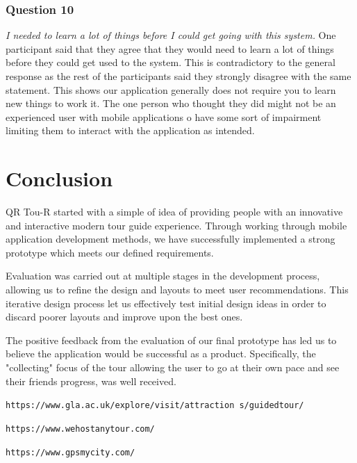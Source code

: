 \documentclass[a4,10pt,twocolumn]{article}
\begin{document}
\subsubsection{Question 10}
\noindent\emph{I needed to learn a lot of things before I could get going with this system.}
\newline
\newline
One participant said that they agree that they would need to learn a lot of things before they could get used to the system. This is contradictory to the general response as the rest of the participants said they strongly disagree with the same statement. This shows our application generally does not require you to learn new things to work it. The one person who thought they did might not be an experienced user with mobile applications o have some sort of impairment limiting them to interact with the application as intended.

\section{Conclusion}
QR Tou-R started with a simple of idea of providing people with an innovative and interactive modern tour guide experience. Through working through mobile application development methods, we have successfully implemented a strong prototype which meets our defined requirements. 

Evaluation was carried out at multiple stages in the development process, allowing us to refine the design and layouts to meet user recommendations. This iterative design process let us effectively test initial design ideas in order to discard poorer layouts and improve upon the best ones. 

The positive feedback from the evaluation of our final prototype has led us to believe the application would be successful as a product. Specifically, the "collecting" focus of the tour allowing the user to go at their own pace and see their friends progress, was well received.

\begin{thebibliography}{9}
\texttt{https://www.gla.ac.uk/explore/visit/attraction
s/guidedtour/}

\texttt{https://www.wehostanytour.com/}

\texttt{https://www.gpsmycity.com/}
\end{thebibliography}
\end{document}

